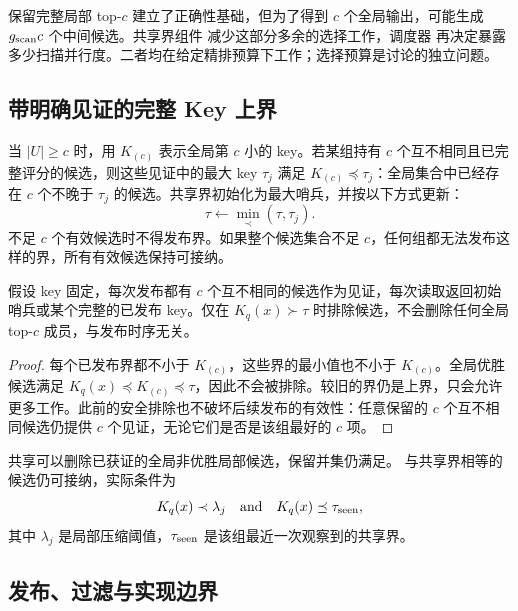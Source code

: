 保留完整局部 top-$c$ 建立了正确性基础，但为了得到 $c$ 个全局输出，可能生成 $g_{\mathrm{scan}} c$ 个中间候选。共享界组件 减少这部分多余的选择工作，调度器 再决定暴露多少扫描并行度。二者均在给定精排预算下工作；选择预算是讨论的独立问题。

\subsection{带明确见证的完整 Key 上界}

当 $|U|\geq c$ 时，用 $K_{(c)}$ 表示全局第 $c$ 小的 key。若某组持有 $c$ 个互不相同且已完整评分的候选，则这些见证中的最大 key $\tau_j$ 满足 $K_{(c)}\preceq\tau_j$：全局集合中已经存在 $c$ 个不晚于 $\tau_j$ 的候选。共享界初始化为最大哨兵，并按以下方式更新：
\begin{equation}
 \tau\leftarrow\min_{\prec}(\tau,\tau_j).
 \label{eq:5-shared-update}
\end{equation}
不足 $c$ 个有效候选时不得发布界。如果整个候选集合不足 $c$，任何组都无法发布这样的界，所有有效候选保持可接纳。

\begin{resultblock}
\begin{proposition}[由见证界安全排除候选]
\label{prop:5-shared-bound}
假设 key 固定，每次发布都有 $c$ 个互不相同的候选作为见证，每次读取返回初始哨兵或某个完整的已发布 key。仅在 $K_q(x)\succ\tau$ 时排除候选，不会删除任何全局 top-$c$ 成员，与发布时序无关。
\end{proposition}
\begin{proof}
每个已发布界都不小于 $K_{(c)}$，这些界的最小值也不小于 $K_{(c)}$。全局优胜候选满足 $K_q(x)\preceq K_{(c)}\preceq\tau$，因此不会被排除。较旧的界仍是上界，只会允许更多工作。此前的安全排除也不破坏后续发布的有效性：任意保留的 $c$ 个互不相同候选仍提供 $c$ 个见证，无论它们是否是该组最好的 $c$ 项。
\end{proof}
\end{resultblock}

共享可以删除已获证的全局非优胜局部候选，保留并集仍满足。
与共享界相等的候选仍可接纳，实际条件为
\begin{equation}
 K_q(x)\prec\lambda_j
 \quad\text{and}\quad
 K_q(x)\preceq\tau_{\rm seen},
 \label{eq:5-admission}
\end{equation}
其中 $\lambda_j$ 是局部压缩阈值，$\tau_{\rm seen}$ 是该组最近一次观察到的共享界。

\subsection{发布、过滤与实现边界}

